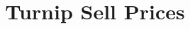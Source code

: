 \documentclass[12pt]{article}
\begin{document}
\title{Turnip Sell Prices}
\maketitle

\end{document}
